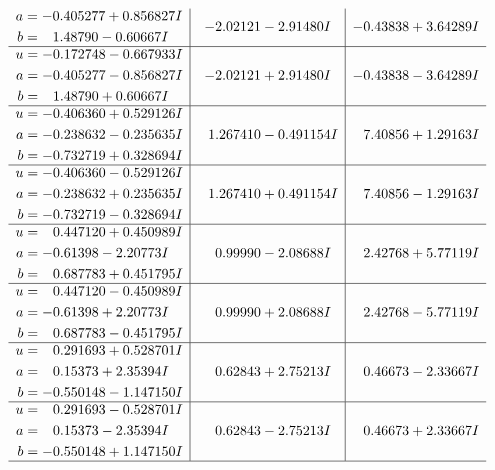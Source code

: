 \documentclass[1p]{elsarticle_modified}
\theoremstyle{definition}
\begin{document}
$$\begin{array}{c|c|c}
\begin{aligned}
a &= -0.405277 + 0.856827 I \\
b &= \phantom{-}1.48790 - 0.60667 I\end{aligned}
 & -2.02121 - 2.91480 I & -0.43838 + 3.64289 I \\ \hline\begin{aligned}
u &= -0.172748 - 0.667933 I \\
a &= -0.405277 - 0.856827 I \\
b &= \phantom{-}1.48790 + 0.60667 I\end{aligned}
 & -2.02121 + 2.91480 I & -0.43838 - 3.64289 I \\ \hline\begin{aligned}
u &= -0.406360 + 0.529126 I \\
a &= -0.238632 - 0.235635 I \\
b &= -0.732719 + 0.328694 I\end{aligned}
 & \phantom{-}1.267410 - 0.491154 I & \phantom{-}7.40856 + 1.29163 I \\ \hline\begin{aligned}
u &= -0.406360 - 0.529126 I \\
a &= -0.238632 + 0.235635 I \\
b &= -0.732719 - 0.328694 I\end{aligned}
 & \phantom{-}1.267410 + 0.491154 I & \phantom{-}7.40856 - 1.29163 I \\ \hline\begin{aligned}
u &= \phantom{-}0.447120 + 0.450989 I \\
a &= -0.61398 - 2.20773 I \\
b &= \phantom{-}0.687783 + 0.451795 I\end{aligned}
 & \phantom{-}0.99990 - 2.08688 I & \phantom{-}2.42768 + 5.77119 I \\ \hline\begin{aligned}
u &= \phantom{-}0.447120 - 0.450989 I \\
a &= -0.61398 + 2.20773 I \\
b &= \phantom{-}0.687783 - 0.451795 I\end{aligned}
 & \phantom{-}0.99990 + 2.08688 I & \phantom{-}2.42768 - 5.77119 I \\ \hline\begin{aligned}
u &= \phantom{-}0.291693 + 0.528701 I \\
a &= \phantom{-}0.15373 + 2.35394 I \\
b &= -0.550148 - 1.147150 I\end{aligned}
 & \phantom{-}0.62843 + 2.75213 I & \phantom{-}0.46673 - 2.33667 I \\ \hline\begin{aligned}
u &= \phantom{-}0.291693 - 0.528701 I \\
a &= \phantom{-}0.15373 - 2.35394 I \\
b &= -0.550148 + 1.147150 I\end{aligned}
 & \phantom{-}0.62843 - 2.75213 I & \phantom{-}0.46673 + 2.33667 I\\
 \hline 
 \end{array}$$\newpage\newpage\renewcommand{\arraystretch}{1}
\end{document}
